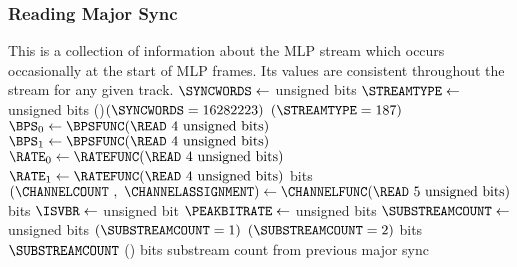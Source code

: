 \clearpage

\subsubsection{Reading Major Sync}
\label{mlp:readmajorsync}
This is a collection of information about the MLP stream
which occurs occasionally at the start of MLP frames.
Its values are consistent throughout the stream for any given track.
{
$\SYNCWORDS \leftarrow$  unsigned bits\;
$\STREAMTYPE \leftarrow$  unsigned bits\;
\eIf(){$(\SYNCWORDS = 16282223)$ \AND $(\STREAMTYPE = 187)$}{
  $\text{\BPS}_0 \leftarrow \BPSFUNC(\text{\READ 4 unsigned bits})$\;
  $\text{\BPS}_1 \leftarrow \BPSFUNC(\text{\READ 4 unsigned bits})$\;
  $\text{\RATE}_0 \leftarrow \RATEFUNC(\text{\READ 4 unsigned bits})$\;
  $\text{\RATE}_1 \leftarrow \RATEFUNC(\text{\READ 4 unsigned bits})$\;
   bits\;
  $(\text{\CHANNELCOUNT}~,~\text{\CHANNELASSIGNMENT}) \leftarrow \CHANNELFUNC(\text{\READ 5 unsigned bits})$\;
   bits\;
  $\text{\ISVBR} \leftarrow$  unsigned bit\;
  $\text{\PEAKBITRATE} \leftarrow$  unsigned bits\;
  $\text{\SUBSTREAMCOUNT} \leftarrow$  unsigned bits\;
  \ASSERT $(\text{\SUBSTREAMCOUNT} = 1)$ \OR $(\text{\SUBSTREAMCOUNT} = 2)$\;
   bits\;
  \Return $\text{\SUBSTREAMCOUNT}$\;
}(){
   bits\;
  \Return substream count from previous major sync\;
}
\EALGORITHM
}
